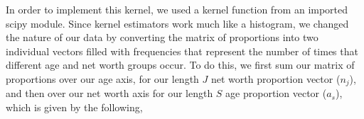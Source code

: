 \documentclass[letterpaper,12pt]{article}
\theoremstyle{definition}
\begin{document}
\begin{spacing}{1.5}






    In order to implement this kernel, we used a kernel function from an imported scipy module. Since kernel estimators work much like a histogram, we changed the nature of our data by converting the matrix of proportions into two individual vectors filled with frequencies that represent the number of times that different age and net worth groups occur. To do this, we first sum our matrix of proportions over our age axis, for our length $J$ net worth proportion vector ($n_j$), and then over our net worth axis for our length $S$ age proportion vector ($a_s$), which is given by the following,


\end{spacing}
\end{document}
